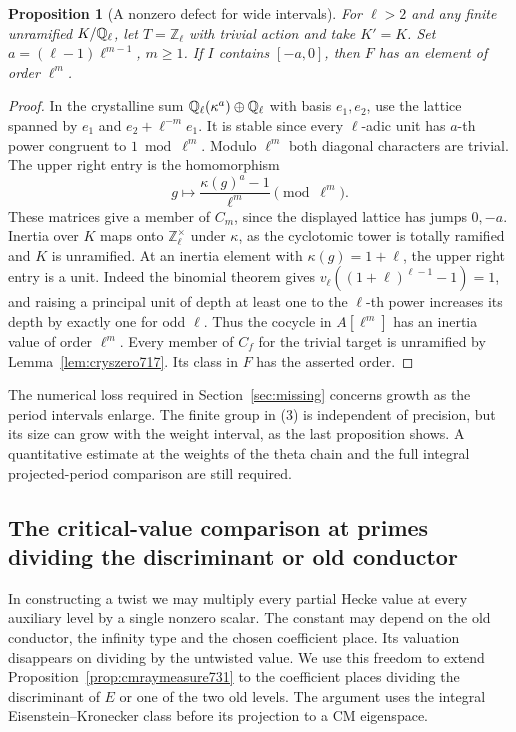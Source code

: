 \documentclass[a4paper,11pt]{article}
\newtheorem{proposition}{Proposition}[section]
\theoremstyle{definition}
\theoremstyle{remark}
\newcommand{\ZZ}{\mathbb Z}\newcommand{\ord}{\operatorname{ord}}
\numberwithin{equation}{section}
\begin{document}
\begin{proposition}[A nonzero defect for wide intervals]
\leavevmode\label{prop:logexample732}
For \(\ell>2\) and any finite unramified \(K/\mathbb Q_\ell\), let
\(T=\ZZ_\ell\) with trivial action and take \(K'=K\).
Set \(a=(\ell-1)\ell^{m-1}\), \(m\ge1\).
If \(I\) contains \([-a,0]\), then \(F\) has an element of order
\(\ell^m\).
\end{proposition}
\begin{proof}
In the crystalline sum \(\mathbb Q_\ell(\kappa^a)\oplus\mathbb Q_\ell\) with
basis \(e_1,e_2\), use the lattice spanned by \(e_1\) and
\(e_2+\ell^{-m}e_1\). It is stable since every \(\ell\)-adic unit
has \(a\)-th power congruent to \(1\bmod\ell^m\). Modulo \(\ell^m\)
both diagonal characters are trivial. The upper right entry is the
homomorphism
\[
          g\longmapsto
          \frac{\kappa(g)^a-1}{\ell^m}\pmod{\ell^m}.
\]
These matrices give a member of \(C_m\), since the displayed lattice
has jumps \(0,-a\). Inertia over \(K\) maps onto
\(\ZZ_\ell^\times\) under \(\kappa\), as the cyclotomic tower is
totally ramified and \(K\) is unramified. At an inertia element
with \(\kappa(g)=1+\ell\), the upper right entry is a unit.
Indeed the binomial theorem gives
\(v_\ell((1+\ell)^{\ell-1}-1)=1\), and raising a principal
unit of depth at least one to the \(\ell\)-th power increases its
depth by exactly one for odd \(\ell\). Thus the cocycle in
\(A[\ell^m]\) has an inertia value of order \(\ell^m\).
Every member of \(C_f\) for the trivial target is unramified by
Lemma~\ref{lem:cryszero717}. Its class in \(F\) has the asserted
order.
\end{proof}

The numerical loss required in Section~\ref{sec:missing} concerns
growth as the period intervals enlarge. The finite group in (3)
is independent of precision, but its size can grow with the
weight interval, as the last proposition shows. A quantitative
estimate at the weights of the theta chain and the full integral
projected-period comparison are still required.
\clearpage

\subsection{The critical-value comparison at primes dividing the discriminant or old conductor}
\label{sec:allcritical733}

In constructing a twist we may multiply every partial Hecke value
at every auxiliary level by a single nonzero scalar. The constant
may depend on the old conductor, the infinity type and the chosen
coefficient place. Its valuation disappears on dividing by the
untwisted value. We use this freedom to extend
Proposition~\ref{prop:cmraymeasure731} to the coefficient places
dividing the discriminant of \(E\) or one of the two old levels.
The argument uses the integral Eisenstein--Kronecker class before
its projection to a CM eigenspace.
\end{document}

